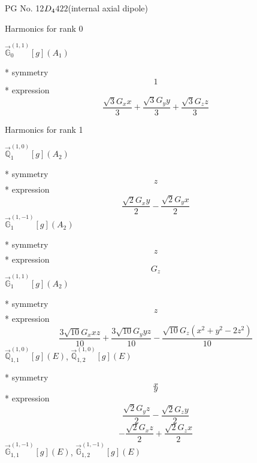 \documentclass[fleqn,8pt]{jsarticle}
\begin{document}
\setcounter{MaxMatrixCols}{32}

\renewcommand{\tablename}{Table~}
\renewcommand{\figurename}{Figure~}
\begin{center}
\LARGE
PG No. 12\quad$D_{\rm 4}$\quad$422$\quad[ tetragonal ] (internal axial dipole)
\end{center}

\noindent * Harmonics for rank 0

\noindent\quad $\vec{\mathbb{G}}_{0}^{(1,1)}[g](A_{1})$

\noindent\quad ** symmetry
\begin{dmath*}
1
\end{dmath*}
\noindent\quad ** expression
\begin{dmath*}
\frac{\sqrt{3} G_{x} x}{3} + \frac{\sqrt{3} G_{y} y}{3} + \frac{\sqrt{3} G_{z} z}{3}
\end{dmath*}

\noindent * Harmonics for rank 1

\noindent\quad $\vec{\mathbb{Q}}_{1}^{(1,0)}[g](A_{2})$

\noindent\quad ** symmetry
\begin{dmath*}
z
\end{dmath*}
\noindent\quad ** expression
\begin{dmath*}
\frac{\sqrt{2} G_{x} y}{2} - \frac{\sqrt{2} G_{y} x}{2}
\end{dmath*}
\noindent\quad $\vec{\mathbb{G}}_{1}^{(1,-1)}[g](A_{2})$

\noindent\quad ** symmetry
\begin{dmath*}
z
\end{dmath*}
\noindent\quad ** expression
\begin{dmath*}
G_{z}
\end{dmath*}
\noindent\quad $\vec{\mathbb{G}}_{1}^{(1,1)}[g](A_{2})$

\noindent\quad ** symmetry
\begin{dmath*}
z
\end{dmath*}
\noindent\quad ** expression
\begin{dmath*}
\frac{3 \sqrt{10} G_{x} x z}{10} + \frac{3 \sqrt{10} G_{y} y z}{10} - \frac{\sqrt{10} G_{z} \left(x^{2} + y^{2} - 2 z^{2}\right)}{10}
\end{dmath*}
\noindent\quad $\vec{\mathbb{Q}}_{1,1}^{(1,0)}[g](E)$, $\vec{\mathbb{Q}}_{1,2}^{(1,0)}[g](E)$

\noindent\quad ** symmetry
\begin{dmath*}
x
\end{dmath*}
\begin{dmath*}
y
\end{dmath*}
\noindent\quad ** expression
\begin{dmath*}
\frac{\sqrt{2} G_{y} z}{2} - \frac{\sqrt{2} G_{z} y}{2}
\end{dmath*}
\begin{dmath*}
- \frac{\sqrt{2} G_{x} z}{2} + \frac{\sqrt{2} G_{z} x}{2}
\end{dmath*}
\noindent\quad $\vec{\mathbb{G}}_{1,1}^{(1,-1)}[g](E)$, $\vec{\mathbb{G}}_{1,2}^{(1,-1)}[g](E)$
\end{document}
